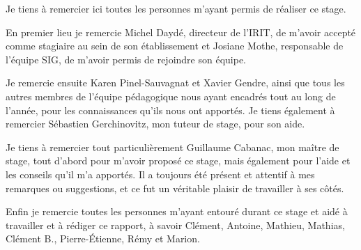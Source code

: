 \cleardoublepage
\begingroup
	\thispagestyle{empty}
	\vspace*{4cm}
	\begin{flushright}
		\begin{minipage}[c]{0.7\textwidth}
			Je tiens à remercier ici toutes les personnes m\rq{}ayant permis de réaliser ce stage.
			
			En premier lieu je remercie Michel Daydé, directeur de l\rq{}IRIT, de m\rq{}avoir accepté comme stagiaire au sein de son établissement et Josiane Mothe, responsable de l\rq{}équipe SIG, de m\rq{}avoir permis de rejoindre son équipe.
			
			Je remercie ensuite Karen Pinel-Sauvagnat et Xavier Gendre, ainsi que tous les autres membres de l\rq{}équipe pédagogique nous ayant encadrés tout au long de l\rq{}année, pour les connaissances qu\rq{}ils nous ont apportés. Je tiens également à remercier Sébastien Gerchinovitz, mon tuteur de stage, pour son aide.
			
			Je tiens à remercier tout particulièrement Guillaume Cabanac, mon maître de stage, tout d\rq{}abord pour m\rq{}avoir proposé ce stage, mais également pour l\rq{}aide et les conseils qu\rq{}il m\rq{}a apportés. Il a toujours été présent et attentif à mes remarques ou suggestions, et ce fut un véritable plaisir de travailler à ses côtés.
			
			Enfin je remercie toutes les personnes m\rq{}ayant entouré durant ce stage et aidé à travailler et à rédiger ce rapport, à savoir Clément, Antoine, Mathieu, Mathias, Clément B., Pierre-Étienne, Rémy et Marion.
		\end{minipage}
	\end{flushright}
\endgroup
